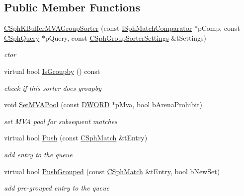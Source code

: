 \subsection*{Public Member Functions}
\begin{DoxyCompactItemize}
\item 
\hyperlink{classCSphKBufferMVAGroupSorter_ad53e876fa35d2dbbf74bc74fe34df497}{C\-Sph\-K\-Buffer\-M\-V\-A\-Group\-Sorter} (const \hyperlink{structISphMatchComparator}{I\-Sph\-Match\-Comparator} $\ast$p\-Comp, const \hyperlink{classCSphQuery}{C\-Sph\-Query} $\ast$p\-Query, const \hyperlink{structCSphGroupSorterSettings}{C\-Sph\-Group\-Sorter\-Settings} \&t\-Settings)
\begin{DoxyCompactList}\small\item\em ctor \end{DoxyCompactList}\item 
virtual bool \hyperlink{classCSphKBufferMVAGroupSorter_aafb1ca01ae8cc143a5b65a1fbd05eb89}{Is\-Groupby} () const 
\begin{DoxyCompactList}\small\item\em check if this sorter does groupby \end{DoxyCompactList}\item 
void \hyperlink{classCSphKBufferMVAGroupSorter_aa6d1b61922f53e7b6262be7a203ab552}{Set\-M\-V\-A\-Pool} (const \hyperlink{sphinxstd_8h_a798af1e30bc65f319c1a246cecf59e39}{D\-W\-O\-R\-D} $\ast$p\-Mva, bool b\-Arena\-Prohibit)
\begin{DoxyCompactList}\small\item\em set M\-V\-A pool for subsequent matches \end{DoxyCompactList}\item 
virtual bool \hyperlink{classCSphKBufferMVAGroupSorter_a550aca8d975faceb2ce4bfa43c10a77d}{Push} (const \hyperlink{classCSphMatch}{C\-Sph\-Match} \&t\-Entry)
\begin{DoxyCompactList}\small\item\em add entry to the queue \end{DoxyCompactList}\item 
virtual bool \hyperlink{classCSphKBufferMVAGroupSorter_a405697753dc313ab3ef5ff397d9fa86a}{Push\-Grouped} (const \hyperlink{classCSphMatch}{C\-Sph\-Match} \&t\-Entry, bool b\-New\-Set)
\begin{DoxyCompactList}\small\item\em add pre-\/grouped entry to the queue \end{DoxyCompactList}\end{DoxyCompactItemize}

